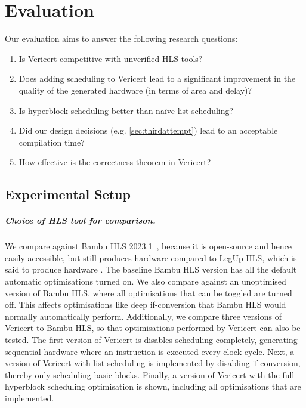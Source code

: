 \graphicspath{{./figures/5-hyperblock-scheduling/}}

\chapter{Evaluation}%
\label{sec:evaluation}%
\label{sec:performance-comparison}

Our evaluation aims to answer the following research questions:

\begin{enumerate}[label=\textbf{RQ\arabic*}]
\item Is Vericert competitive with unverified HLS tools?
\item Does adding scheduling to Vericert lead to a significant improvement in
  the quality of the generated hardware (in terms of area and delay)?
\item Is hyperblock scheduling better than na\"ive list scheduling?
\item Did our design decisions (e.g. \cref{sec:thirdattempt}) lead to an
  acceptable compilation time?
\item How effective is the correctness theorem in Vericert?
\end{enumerate}

\section{Experimental Setup}

\def\polybench{PolyBench/C}

\paragraph{Choice of HLS tool for comparison.} We compare \vericert{} against
Bambu HLS 2023.1~\cite{ferrandi21_bambu}, because it is open-source and hence
easily accessible, but still produces hardware
 compared to LegUp HLS, which is said to produce hardware
.  The baseline Bambu HLS version has all the
default automatic optimisations turned on.  We also compare against an
unoptimised version of Bambu HLS, where all optimisations that can be toggled
are turned off.  This affects optimisations like deep if-conversion that Bambu
HLS would normally automatically perform.  Additionally, we compare three
versions of Vericert to Bambu HLS, so that optimisations performed by Vericert
can also be tested.  The first version of Vericert is disables scheduling
completely, generating sequential hardware where an instruction is executed
every clock cycle.  Next, a version of Vericert with list scheduling is
implemented by disabling if-conversion, thereby only scheduling basic blocks.
Finally, a version of Vericert with the full hyperblock scheduling optimisation
is shown, including all optimisations that are implemented.

